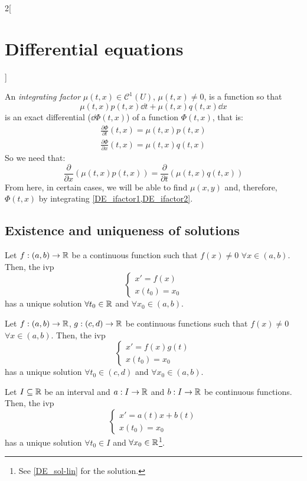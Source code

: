 \documentclass[../../../main_math.tex]{subfiles}
\begin{document}
\begin{multicols}{2}[\section{Differential equations}]
\begin{method}
    An \emph{integrating factor} $\mu(t,x)\in\mathcal{C}^1(U)$, $\mu(t,x)\ne 0$, is a function so that $$\mu(t,x)p(t,x)\dd{t}+\mu(t,x)q(t,x)\dd{x}$$ is an exact differential ($\dd{\Phi(t,x)}$) of a function $\Phi(t,x)$, that is:
    \begin{gather}
      \label{DE_ifactor1}\frac{\partial\Phi}{\partial t}(t,x)=\mu(t,x)p(t,x)\\
      \label{DE_ifactor2}\frac{\partial\Phi}{\partial x}(t,x)=\mu(t,x)q(t,x)
    \end{gather}
    So we need that: $$\frac{\partial}{\partial x}\left(\mu(t,x)p(t,x)\right)=\frac{\partial}{\partial t}\left(\mu(t,x)q(t,x)\right)$$
    From here, in certain cases, we will be able to find $\mu(x,y)$ and, therefore, $\Phi(t,x)$ by integrating \cref{DE_ifactor1,DE_ifactor2}.
  \end{method}
  \subsection{Existence and uniqueness of solutions}
  \begin{proposition}
    Let $f:(a,b)\rightarrow\mathbb{R}$ be a continuous function such that $f(x)\ne 0$ $\forall x\in(a,b)$. Then, the ivp
    $$
      \begin{cases}
        x'      =f(x) \\
        x(t_0)  =x_0
      \end{cases}
    $$
    has a unique solution $\forall t_0\in\mathbb{R}$ and $\forall x_0\in(a,b)$.
  \end{proposition}
  \begin{proposition}
    Let $f:(a,b)\rightarrow\mathbb{R}$, $g:(c,d)\rightarrow\mathbb{R}$ be continuous functions such that $f(x)\ne 0$ $\forall x\in(a,b)$. Then, the ivp
    $$\begin{cases}
        x'      =f(x)g(t) \\
        x(t_0)  =x_0
      \end{cases}$$
    has a unique solution $\forall t_0\in(c,d)$ and $\forall x_0\in(a,b)$.
  \end{proposition}
  \begin{proposition}
    Let $I\subseteq\mathbb{R}$ be an interval and $a:I\rightarrow\mathbb{R}$ and $b:I\rightarrow\mathbb{R}$ be continuous functions. Then, the ivp
    $$\begin{cases}
        x'      =a(t)x+b(t) \\
        x(t_0)  =x_0
      \end{cases}$$
    has a unique solution $\forall t_0\in I$ and $\forall x_0\in\mathbb{R}$\footnote{See \cref{DE_sol-lin} for the solution.}.
  \end{proposition}

\end{multicols}
\end{document}
